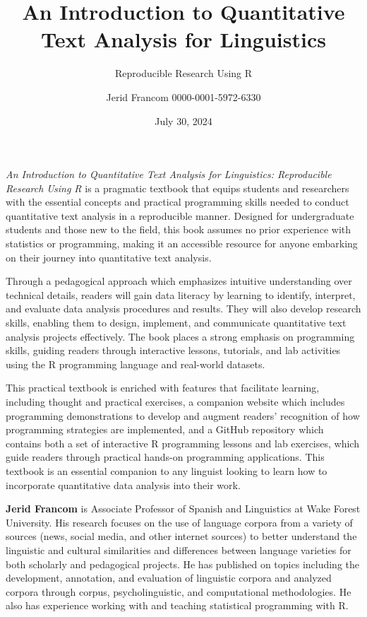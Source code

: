 \documentclass[
  letterpaper,
  krantz1]{latex/krantz-mod}
\title{An Introduction to Quantitative Text Analysis for Linguistics}
\subtitle{Reproducible Research Using R}
\author{Jerid Francom 0000-0001-5972-6330}%
\date{July 30, 2024}
\theoremstyle{definition}
\theoremstyle{definition}
\theoremstyle{remark}
\begin{document}
\setcounter{page}{1} %

\textit{An Introduction to Quantitative Text Analysis for Linguistics: Reproducible Research Using R} is a pragmatic textbook that equips students and researchers with the essential concepts and practical programming skills needed to conduct quantitative text analysis in a reproducible manner. Designed for undergraduate students and those new to the field, this book assumes no prior experience with statistics or programming, making it an accessible resource for anyone embarking on their journey into quantitative text analysis.


Through a pedagogical approach which emphasizes intuitive understanding over technical details, readers will gain data literacy by learning to identify, interpret, and evaluate data analysis procedures and results. They will also develop research skills, enabling them to design, implement, and communicate quantitative text analysis projects effectively. The book places a strong emphasis on programming skills, guiding readers through interactive lessons, tutorials, and lab activities using the R programming language and real-world datasets.


This practical textbook is enriched with features that facilitate learning, including thought and practical exercises, a companion website which includes programming demonstrations to develop and augment readers' recognition of how programming strategies are implemented, and a GitHub repository which contains both a set of interactive R programming lessons and lab exercises, which guide readers through practical hands-on programming applications. This textbook is an essential companion to any linguist looking to learn how to incorporate quantitative data analysis into their work.


\textbf{Jerid Francom} is Associate Professor of Spanish and Linguistics at Wake Forest University. His research focuses on the use of language corpora from a variety of sources (news, social media, and other internet sources) to better understand the linguistic and cultural similarities and differences between language varieties for both scholarly and pedagogical projects. He has published on topics including the development, annotation, and evaluation of linguistic corpora and analyzed corpora through corpus, psycholinguistic, and computational methodologies. He also has experience working with and teaching statistical programming with R.
\end{document}

